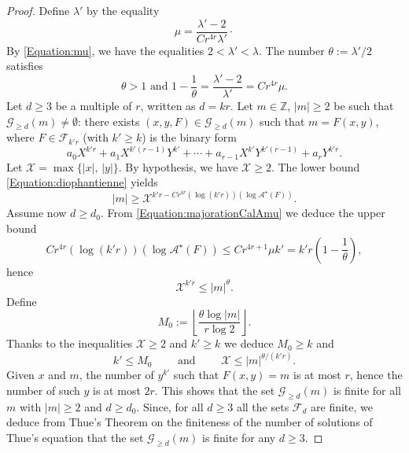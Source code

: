 \documentclass[10pt,a4paper]{amsart}
\newcommand {\Z}{{\mathbb{Z}}}
\begin{document}
\begin{proof} Define $\lambda'$ by the equality 
\[
\mu = \frac{\lambda' -2} {C r^{4r} \lambda'}\cdotp
\]
By \eqref{Equation:mu}, we have the equalities $2 < \lambda' < \lambda$. The number $\theta := \lambda'/2$ satisfies
\[
\theta >1 \text{ and } 1-\frac 1 \theta = \frac{\lambda'-2}{\lambda'} = Cr^{4r}\mu.
\]
Let $d\geqslant 3$ be a multiple of $r$, written as $d=kr$. Let $m\in \Z$, $\vert m \vert \geqslant 2$ be such that $\mathcal G_{\geqslant d} (m) \neq \emptyset$: there exists $(x,y, F) \in {\mathcal G}_{\geqslant d} (m)$ such that $m=F(x,y)$, where $F\in \mathcal F_{k'r} $ (with $k'\geqslant k$) is the binary form
\[
a_0 X^{k'r} +a_1 X^{k'(r-1)} Y^{k'}+\cdots +a_{r-1} X^{k'} Y^{k'(r-1)} + a_r Y^{k'r}.
\]
Let $\mathcal X = \max \{ \vert x \vert, \, \vert y \vert \}$. By hypothesis, we have $\mathcal X \geqslant 2$. The lower bound \eqref{Equation:diophantienne} yields 
\[
\vert m \vert \geqslant \mathcal X^{k'r -Cr^{4r} (\log (k'r))(\log \mathcal A^\star (F))}.
\]
Assume now $d\geqslant d_0$. 
From \eqref{Equation:majorationCalAmu} we deduce the upper bound
\[
Cr^{4r} (\log (k'r)) (\log \mathcal A^\star (F)) \leqslant Cr^{4r+1} \mu k' = k'r \left( 1 -\frac 1 \theta \right),
\]
hence
\[
\mathcal X^{k'r} \leqslant \vert m \vert^\theta.
\]
Define
\[
M_0:= \left\lfloor \frac{\theta \log \vert m \vert}{r \log 2}\right\rfloor.
 \] 
Thanks to the inequalities $\mathcal X \geqslant 2$ and $k'\geqslant k$ we deduce $M_0\geqslant k$ and
\begin{equation}\label{Equation:M0}
k'\leqslant M_0 \qquad \text{ and } \qquad \mathcal X \leqslant \vert m \vert ^{\theta/ (k'r)}.
\end{equation}
Given $x$ and $m$, the number of $y^{k'}$ such that $F(x,y)=m$ is at most $r$, hence the number of such $y$ is at most $2r$. This shows that the set $\mathcal G_{\geqslant d} (m)$ is finite for all $m$ with $|m|\geqslant 2$ and $d\geqslant d_0$. Since, for all $d \geqslant 3$ all the sets $\mathcal F_d$ are finite, we deduce from Thue's Theorem on the finiteness of the number of solutions of Thue's equation that the set $\mathcal G_{\geqslant d} (m)$
is finite for any $d\geqslant 3$.


\end{proof}
\end{document}
